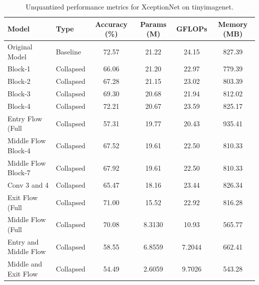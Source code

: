 \begin{table}
\caption{Unquantized performance metrics for XceptionNet on tinyimagenet.}
\label{tab:XceptionNet_tinyimagenet_unquant}
\begin{tabular}{llcccc}
\toprule
Model & Type & Accuracy (\%) & Params (M) & GFLOPs & Memory (MB) \\
\midrule
Original Model & Baseline & 72.57 & 21.22 & 24.15 & 827.39 \\
Block-1 & Collapsed & 66.06 & 21.20 & 22.97 & 779.39 \\
Block-2 & Collapsed & 67.28 & 21.15 & 23.02 & 803.39 \\
Block-3 & Collapsed & 69.30 & 20.68 & 21.94 & 812.02 \\
Block-4 & Collapsed & 72.21 & 20.67 & 23.59 & 825.17 \\
Entry Flow (Full & Collapsed & 57.31 & 19.77 & 20.43 & 935.41 \\
Middle Flow Block-4 & Collapsed & 67.52 & 19.61 & 22.50 & 810.33 \\
Middle Flow Block-7 & Collapsed & 67.92 & 19.61 & 22.50 & 810.33 \\
Conv 3 and 4 & Collapsed & 65.47 & 18.16 & 23.44 & 826.34 \\
Exit Flow (Full & Collapsed & 71.00 & 15.52 & 22.92 & 816.28 \\
Middle Flow (Full & Collapsed & 70.08 & 8.3130 & 10.93 & 565.77 \\
Entry and Middle Flow & Collapsed & 58.55 & 6.8559 & 7.2044 & 662.41 \\
Middle and Exit Flow & Collapsed & 54.49 & 2.6059 & 9.7026 & 543.28 \\
\bottomrule
\end{tabular}
\end{table}
